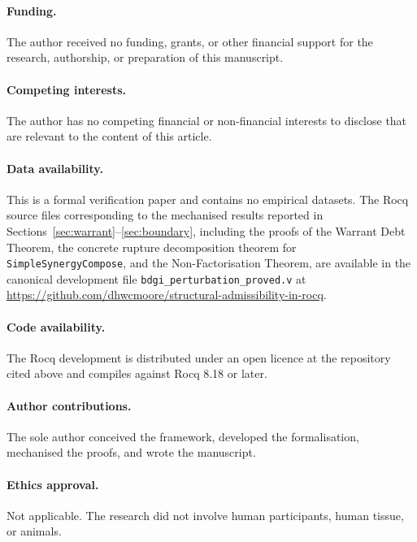 \documentclass[12pt]{article}
\theoremstyle{plain}
\theoremstyle{definition}
\theoremstyle{remark}
\begin{document}
\paragraph{Funding.}
The author received no funding, grants, or other financial support
for the research, authorship, or preparation of this manuscript.

\paragraph{Competing interests.}
The author has no competing financial or non-financial interests to
disclose that are relevant to the content of this article.

\paragraph{Data availability.}
This is a formal verification paper and contains no empirical
datasets. The Rocq source files corresponding to the mechanised
results reported in Sections~\ref{sec:warrant}--\ref{sec:boundary},
including the proofs of the Warrant Debt Theorem, the concrete
rupture decomposition theorem for \texttt{SimpleSynergyCompose}, and
the Non-Factorisation Theorem, are available in the canonical
development file \texttt{bdgi\_perturbation\_proved.v} at
\url{https://github.com/dhwcmoore/structural-admissibility-in-rocq}.

\paragraph{Code availability.}
The Rocq development is distributed under an open licence at the
repository cited above and compiles against Rocq 8.18 or later.

\paragraph{Author contributions.}
The sole author conceived the framework, developed the formalisation,
mechanised the proofs, and wrote the manuscript.

\paragraph{Ethics approval.}
Not applicable. The research did not involve human participants,
human tissue, or animals.
\end{document}
